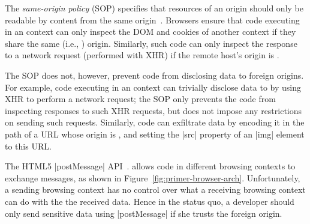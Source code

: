 The {\em same-origin policy} (SOP) specifies that resources of an
origin should only be readable by content from the same
origin~\cite{rfc6454, googlehandbook, VanKesteren2012}.  Browsers
ensure that code executing in an  context can only
inspect the DOM and cookies of another context if they share the same
(i.e., ) origin. Similarly, such code can only inspect
the response to a network request (performed with XHR) if the remote
host's origin is .
%
 
The SOP does not, however, prevent code from disclosing data to
foreign origins. For example, code executing in an 
context can trivially disclose data to  by using XHR to
perform a network request; the SOP only prevents the code from
inspecting responses to such XHR requests, but does not impose any
restrictions on sending such requests.
Similarly, code can exfiltrate data by encoding it in the path of a
URL whose origin is , and setting the \js|src| property
of an \js|img| element to this URL.


The HTML5 \js|postMessage| API~\cite{webmessaging}.
allows code in different browsing contexts to exchange
messages, as shown in Figure~\ref{fig:primer-browser-arch}.
%
%
Unfortunately, a sending browsing context has no control over what a
receiving browsing context can do with the the received data. Hence in the
status quo, a developer should only send sensitive data using
\js|postMessage| if she trusts the foreign origin.
%

